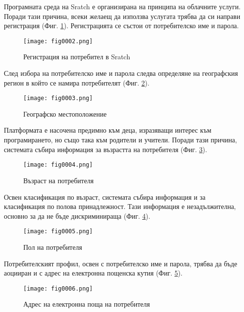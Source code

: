 Програмната среда на Sratch е организирана на принципа на облачните услуги. Поради тази причина, всеки желаещ да използва услугата трябва да си направи регистрация (Фиг. \ref{fig0002}). Регистрацията се състои от потребителско име и парола.

\begin{figure}[H]
  \centering
  \texttt{[image: fig0002.png]}
  \caption{Регистрация на потребител в Sratch}
\label{fig0002}
\end{figure}

След избора на потребителско име и парола следва определяне на географския регион в който се намира потребителят (Фиг. \ref{fig0003}).

\begin{figure}[H]
  \centering
  \texttt{[image: fig0003.png]}
  \caption{Географско местоположение}
\label{fig0003}
\end{figure}

Платформата е насочена предимно към деца, изразяващи интерес към програмирането, но също така към родители и учители. Поради тази причина, системата събира информация за възрастта на потребителя (Фиг. \ref{fig0004}).

\begin{figure}[H]
  \centering
  \texttt{[image: fig0004.png]}
  \caption{Възраст на потребителя}
\label{fig0004}
\end{figure}

Освен класификация по възраст, системата събира информация и за класификация по полова принадлежност. Тази информация е незадължителна, основно за да не бъде дискриминираща (Фиг. \ref{fig0005}).

\begin{figure}[H]
  \centering
  \texttt{[image: fig0005.png]}
  \caption{Пол на потребителя}
\label{fig0005}
\end{figure}

Потребителският профил, освен с потребителско име и парола, трябва да бъде аоцииран и с адрес на електронна пощенска кутия (Фиг. \ref{fig0006}).

\begin{figure}[H]
  \centering
  \texttt{[image: fig0006.png]}
  \caption{Адрес на електронна поща на потребителя}
\label{fig0006}
\end{figure}

